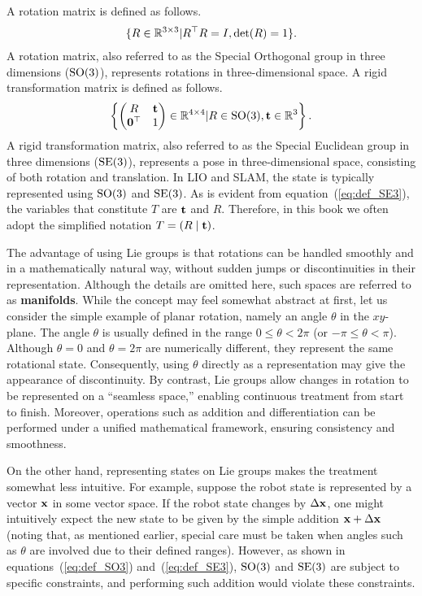 A rotation matrix is defined as follows.
%
\begin{align}
  \{R \in \mathbb{R}^{3 \times 3} | R^{\top} R = I, {\rm det}(R) = 1\}.
  \label{eq:def_SO3}
\end{align}
%
A rotation matrix, also referred to as the Special Orthogonal group in three dimensions (${\rm SO}(3)$), represents rotations in three-dimensional space.
A rigid transformation matrix is defined as follows.
%
\begin{align}
  \left\{ \left( \begin{matrix} R & {\bf t} \\ {\bf 0}^{\top} & 1 \end{matrix} \right) \in \mathbb{R}^{4 \times 4} | R \in {\rm SO}(3), {\bf t} \in \mathbb{R}^{3} \right\}.
  \label{eq:def_SE3}
\end{align}
%
A rigid transformation matrix, also referred to as the Special Euclidean group in three dimensions (${\rm SE}(3)$), represents a pose in three-dimensional space, consisting of both rotation and translation.
In LIO and SLAM, the state is typically represented using ${\rm SO}(3)$ and ${\rm SE}(3)$.
As is evident from equation~(\ref{eq:def_SE3}), the variables that constitute $T$ are ${\bf t}$ and $R$.
Therefore, in this book we often adopt the simplified notation $T = \left( R \mid {\bf t} \right)$.

The advantage of using Lie groups is that rotations can be handled smoothly and in a mathematically natural way, without sudden jumps or discontinuities in their representation.
Although the details are omitted here, such spaces are referred to as {\bf manifolds}.
While the concept may feel somewhat abstract at first, let us consider the simple example of planar rotation, namely an angle $\theta$ in the $xy$-plane.
The angle $\theta$ is usually defined in the range $0 \leq \theta < 2\pi$ (or $-\pi \leq \theta < \pi$).
Although $\theta = 0$ and $\theta = 2\pi$ are numerically different, they represent the same rotational state.
Consequently, using $\theta$ directly as a representation may give the appearance of discontinuity. 
By contrast, Lie groups allow changes in rotation to be represented on a ``seamless space,'' enabling continuous treatment from start to finish.
Moreover, operations such as addition and differentiation can be performed under a unified mathematical framework, ensuring consistency and smoothness.

On the other hand, representing states on Lie groups makes the treatment somewhat less intuitive.
For example, suppose the robot state is represented by a vector ${\bf x}$ in some vector space.
If the robot state changes by $\Delta {\bf x}$, one might intuitively expect the new state to be given by the simple addition ${\bf x} + \Delta {\bf x}$ (noting that, as mentioned earlier, special care must be taken when angles such as $\theta$ are involved due to their defined ranges).
However, as shown in equations~(\ref{eq:def_SO3}) and~(\ref{eq:def_SE3}), ${\rm SO}(3)$ and ${\rm SE}(3)$ are subject to specific constraints, and performing such addition would violate these constraints.


